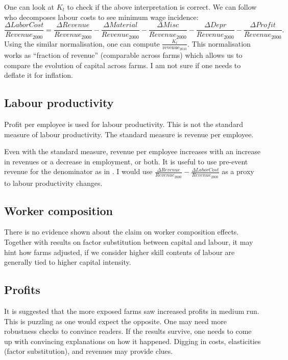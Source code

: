 One can look at $K_{t}$ to check if the above interpretation is correct. We can follow \citet[][p.2712]{HarasztosiLindner2019} who decomposes labour costs to see minimum wage incidence:
\[
\frac{\Delta LaborCost}{Revenue_{2000}}
=
\frac{\Delta Revenue}{Revenue_{2000}}
-\frac{\Delta Material}{Revenue_{2000}}
-\frac{\Delta Misc}{Revenue_{2000}}
-
\frac{\Delta Depr}{Revenue_{2000}}
-\frac{\Delta Profit}{Revenue_{2000}}.
\]
Using the similar normalisation, one can compute $\frac{K_{t}}{\mbox{revenue}_{2010}}$. This normalisation works as ``fraction of revenue'' (comparable across farms) which allows us to compare the evolution of capital across farms. I am not sure if one needs to deflate it for inflation.

\subsection{Labour productivity}

Profit per employee is used for labour productivity. This is not the standard measure of labour productivity. The standard measure is revenue per employee.

Even with the standard measure, revenue per employee increases with an increase in revenues or a decrease in employment, or both. It is useful to use pre-event revenue for the denominator as in \citet[][p.2712]{HarasztosiLindner2019}. I would use $\frac{\Delta Revenue}{Revenue_{2000}}-\frac{\Delta LaborCost}{Revenue_{2000}}$ as a proxy to labour productivity changes.

\subsection{Worker composition}

There is no evidence shown about the claim on worker composition effects. Together with results on factor substitution between capital and labour, it may hint how farms adjusted, if we consider higher skill contents of labour are generally tied to higher capital intensity.

\subsection{Profits}

It is suggested that the more exposed farms saw increased profits in medium run. This is puzzling as one would expect the opposite. One may need more robustness checks to convince readers. If the results survive, one needs to come up with convincing explanations on how it happened. Digging in costs, elasticities (factor substitution), and revenues may provide clues.

